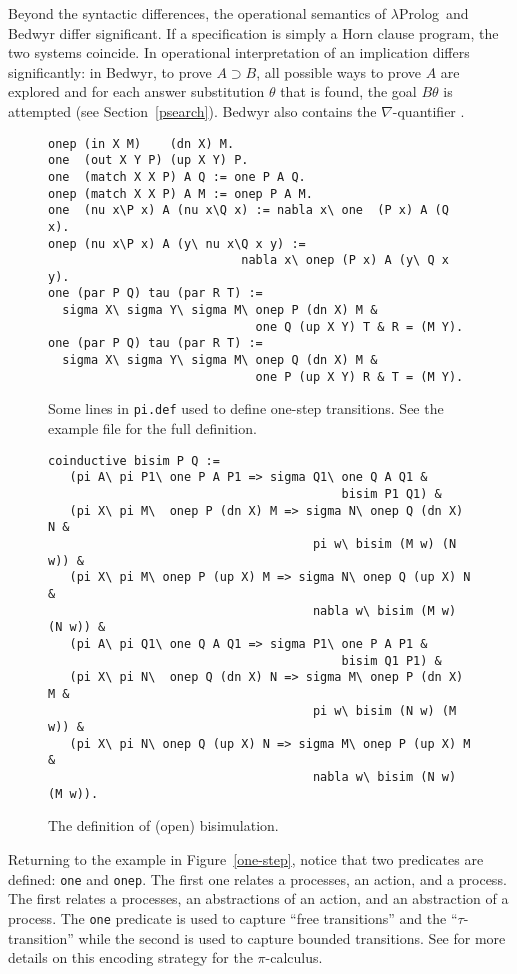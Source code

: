 \documentclass{article}
\newcommand{\lp}{$\lambda$Prolog}
\begin{document}
Beyond the syntactic differences, the operational semantics of \lp\
and Bedwyr differ significant.  If a specification is simply a Horn
clause program, the two systems coincide.  In operational
interpretation of an implication differs significantly: in Bedwyr, to
prove $A\supset B$, all possible ways to prove $A$ are explored and
for each answer substitution $\theta$ that is found, the goal
$B\theta$ is attempted (see Section~\ref{psearch}).  Bedwyr also
contains the $\nabla$-quantifier \cite{miller05tocl}. 

\begin{figure}
\begin{verbatim}
onep (in X M)    (dn X) M.
one  (out X Y P) (up X Y) P.
one  (match X X P) A Q := one P A Q.
onep (match X X P) A M := onep P A M.
one  (nu x\P x) A (nu x\Q x) := nabla x\ one  (P x) A (Q x).
onep (nu x\P x) A (y\ nu x\Q x y) := 
                           nabla x\ onep (P x) A (y\ Q x y).
one (par P Q) tau (par R T) :=
  sigma X\ sigma Y\ sigma M\ onep P (dn X) M &
                             one Q (up X Y) T & R = (M Y).
one (par P Q) tau (par R T) :=
  sigma X\ sigma Y\ sigma M\ onep Q (dn X) M &
                             one P (up X Y) R & T = (M Y).
\end{verbatim}
\caption{Some lines in {\tt pi.def} used to define one-step
  transitions.  See the example file for the full definition.}
\label{one-step}

\begin{verbatim}
coinductive bisim P Q :=
   (pi A\ pi P1\ one P A P1 => sigma Q1\ one Q A Q1 &
                                         bisim P1 Q1) &
   (pi X\ pi M\  onep P (dn X) M => sigma N\ onep Q (dn X) N & 
                                     pi w\ bisim (M w) (N w)) &
   (pi X\ pi M\ onep P (up X) M => sigma N\ onep Q (up X) N &
                                     nabla w\ bisim (M w) (N w)) &
   (pi A\ pi Q1\ one Q A Q1 => sigma P1\ one P A P1 & 
                                         bisim Q1 P1) &
   (pi X\ pi N\  onep Q (dn X) N => sigma M\ onep P (dn X) M & 
                                     pi w\ bisim (N w) (M w)) &
   (pi X\ pi N\ onep Q (up X) N => sigma M\ onep P (up X) M &
                                     nabla w\ bisim (N w) (M w)).
\end{verbatim}
\caption{The definition of (open) bisimulation.}
\label{bisim}
\end{figure}

Returning to the example in Figure~\ref{one-step}, notice that two
predicates are defined: {\tt one} and {\tt onep}.  The first one
relates a processes, an action, and a process.  The first relates a 
processes, an abstractions of an action, and an abstraction of a
process.  The {\tt one} predicate is used to capture ``free
transitions'' and the ``$\tau$-transition'' while the second is used
to capture bounded transitions.  See \cite{tiu04fguc,tiu05concur} for
more details on this encoding strategy for the $\pi$-calculus.
\end{document}
